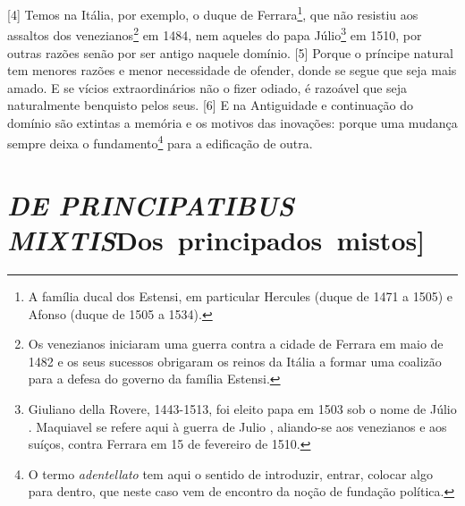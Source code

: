 {[}4{]} Temos na Itália, por exemplo, o duque de Ferrara\footnote{A
  família ducal dos Estensi, em particular Hercules  (duque de 1471 a
  1505) e Afonso  (duque de 1505 a 1534).}, que não resistiu aos
assaltos dos venezianos\footnote{Os venezianos iniciaram uma guerra
  contra a cidade de Ferrara em maio de 1482 e os seus sucessos
  obrigaram os reinos da Itália a formar uma coalizão para a defesa do
  governo da família Estensi.} em 1484, nem aqueles do papa
Júlio\footnote{Giuliano della Rovere, 1443-1513, foi eleito papa em 1503
  sob o nome de Júlio . Maquiavel se refere aqui à guerra de Julio ,
  aliando-se aos venezianos e aos suíços, contra Ferrara em 15 de
  fevereiro de 1510.} em 1510, por outras razões senão por ser antigo
naquele domínio. {[}5{]} Porque o príncipe natural tem menores razões e
menor necessidade de ofender, donde se segue que seja mais amado. E se
vícios extraordinários não o fizer odiado, é razoável que seja
naturalmente benquisto pelos seus. {[}6{]} E na Antiguidade e
continuação do domínio são extintas a memória e os motivos das
inovações: porque uma mudança sempre deixa o fundamento\footnote{O termo
  \emph{adentellato} tem aqui o sentido de introduzir, entrar, colocar
  algo para dentro, que neste caso vem de encontro da noção de fundação
  política.} para a edificação de outra.


\quebra\section{\emph{DE PRINCIPATIBUS MIXTIS}\break {[}Dos~principados~mistos{]}}

